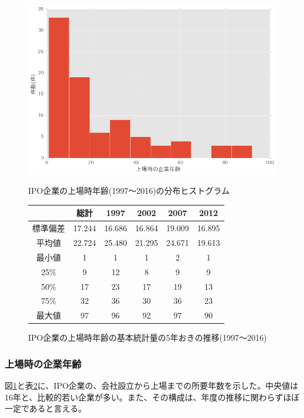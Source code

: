 \documentclass{jsarticle}
\begin{document}
\begin{figure}[!h]
  \begin{center}
  \caption{IPO企業の上場時年齢(1997〜2016)の分布ヒストグラム}
    \includegraphics[clip,width=14cm]{./age.png}
    \label{agehist}
  \end{center}
\end{figure}

\begin{figure}[!h]
  \begin{center}
  \caption{IPO企業の上場時年齢の基本統計量の5年おきの推移(1997〜2016)}
\begin{tabular}{cccccc}
\hline
\  & 総計 & 1997 & 2002 & 2007 & 2012  \\
 \hline \hline
標準偏差 & 17.244 & 16.686 & 16.864 & 19.009 & 16.895   \\
\hline
平均値 & 22.724 & 25.480 & 21.295 & 24.671 & 19.613   \\
\hline
最小値 & 1 & 1 & 1 & 2 & 1   \\
25\% & 9 & 12 & 8 & 9 & 9   \\
50\% & 17 & 23 & 17 & 19 & 13   \\
75\% & 32 & 36 & 30 & 36 & 23   \\
最大値 & 97 & 96 & 92 & 97 & 90   \\
\hline
	\end{tabular}
	\label{age} 
  \end{center}
\end{figure}

\newpage

\subsubsection{上場時の企業年齢}
図\ref{agehist}と表\ref{age}に、IPO企業の、会社設立から上場までの所要年数を示した。中央値は16年と、比較的若い企業が多い。また、その構成は、年度の推移に関わらずほぼ一定であると言える。
\end{document}
